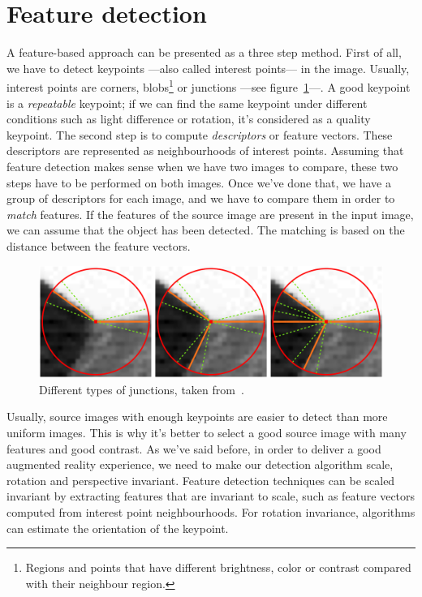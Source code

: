 \section{Feature detection}
A feature-based approach can be presented as a three step method. First of all, we
have to detect keypoints\cite{feature} ---also called interest points--- in the
image. Usually, 
interest points are corners, blobs\footnote{Regions and points that have
  different brightness, color or contrast compared with their neighbour
  region.} or junctions ---see figure~\ref{fig:junctions}---. A good keypoint is a 
\emph{repeatable} keypoint; if we can find the same keypoint under different
conditions such as light difference or rotation, it's considered as a quality
keypoint. The second step is to compute \emph{descriptors} or feature
vectors. These descriptors are represented as neighbourhoods of interest
points. Assuming that feature
detection makes sense when we have two images to compare, these two steps have to be
performed on both images. Once we've done that, we have a group of descriptors for
each image, and we have to compare them in order to \emph{match} features. If the
features of the source image are present in the input image, we can assume that the
object has been detected. The matching is based on the distance between the feature
vectors. 

\begin{figure}
\centering
\includegraphics[scale=0.25]{img/junction.png}
\caption{\label{fig:junctions}Different types of junctions, taken
  from~\cite{junction}.} 
\end{figure} 

Usually, source images with enough keypoints are easier to detect than more
uniform images. This is why it's better to select a good source image with many
features and good contrast. 
As we've said before, in order to deliver a good augmented reality experience,
we need to make our detection algorithm scale, rotation and perspective
invariant. Feature detection techniques can be scaled invariant by extracting
features that are invariant to scale, such as feature vectors computed from
interest point neighbourhoods. For rotation invariance, algorithms can
estimate the orientation of the keypoint. %

